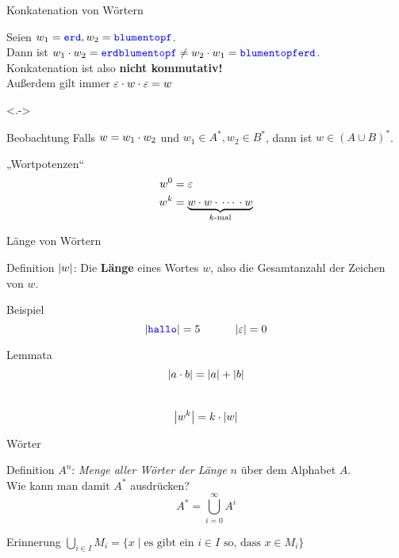\begin{frame}[t]{Konkatenation von Wörtern}
	\begin{block}{}
		Seien $w_1 = \hbox{\textcolor{blue}{\texttt{erd}}}, w_2 = \hbox{\textcolor{blue}{\texttt{blumentopf}}}$. \\
		Dann ist $ w_1 \cdot w_2 = \hbox{\textcolor{blue}{\texttt{erdblumentopf}}} \neq w_2 \cdot w_1 = \hbox{\textcolor{blue}{\texttt{blumentopferd}}}$. \\ 
		\pause
		Konkatenation ist also \textbf{nicht kommutativ!} \\
		 \medskip
		Außerdem gilt immer $ \varepsilon \cdot w \cdot \varepsilon = w $
	\end{block}
	
	
	\visible<.->{
		\begin{block}{Beobachtung}
			Falls $w=w_1\cdot w_2 $ und $w_1 \in A^* , w_2 \in B^* $, dann ist
			$ w\in (A \cup B)^* $.
		\end{block}
	
		\begin{block}{„Wortpotenzen“}
			\vspace{-2\baselineskip}
			\begin{align*}
				w^0 &= \varepsilon \\
				w^k &= \underbrace{w \cdot w \cdot \, \cdots \, \cdot w}_{\text{$k$-mal}}
			\end{align*}
	
		\end{block}
	}

\end{frame}

\begin{frame}{Länge von Wörtern}
	\begin{block}{Definition}
		$\left\lvert w \right\rvert$: Die \textbf{Länge} eines Wortes $w$, also die Gesamtanzahl der Zeichen von $w$.
	\end{block}
	
	\begin{block}{Beispiel}
		$$ \size{\word{hallo}} = 5 \qqquad \size \eps = 0$$
	\end{block}

	\pause
	\begin{block}{Lemmata}
		$$ \left\lvert a \cdot b \right\rvert = \left\lvert a \right\rvert + \left\lvert b \right\rvert $$ \\
		\pause
		$$ \left\lvert w^k \right\rvert = k \cdot \left\lvert w \right\rvert $$
	\end{block}

\end{frame}

\begin{frame}{Wörter}
	\begin{block}{Definition}
		$A^n$: \emph{Menge aller Wörter der Länge $n$} über dem Alphabet $A$.\\
		Wie kann man damit $A^*$ ausdrücken? \\
		\pause
		\[ A^* = \bigcup \limits_{i = 0}^\infty A^i \]
	\end{block}
	
	
	\pause
	\begin{block}{Erinnerung}
		$
		\bigcup \limits_{i\in I} M_i = \{ x \mid \text{es gibt ein } i\in I \text{ so, dass } x\in  M_i \}  
		$
	\end{block}
\end{frame}

